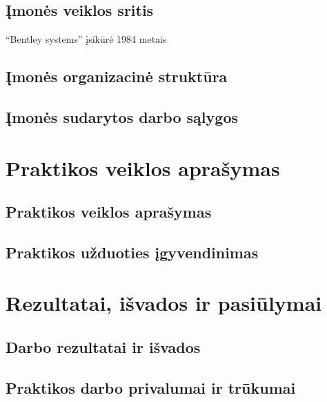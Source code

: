 \documentclass{VUMIFPSPraktika}
\begin{document}
\subsection{Įmonės veiklos sritis}
\enquote{Bentley systems} įsikūrė 1984 metais 
\subsection{Įmonės organizacinė struktūra}
\subsection{Įmonės sudarytos darbo sąlygos}

\section{Praktikos veiklos aprašymas}
\subsection{Praktikos veiklos aprašymas}
\subsection{Praktikos užduoties įgyvendinimas}

\section{Rezultatai, išvados ir pasiūlymai}
\subsection{Darbo rezultatai ir išvados}
\subsection{Praktikos darbo privalumai ir trūkumai}
\end{document}
